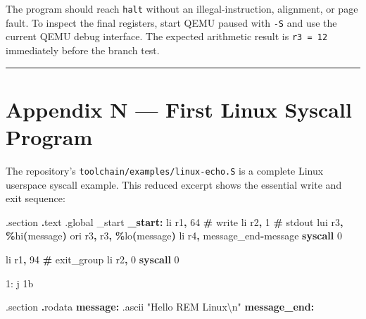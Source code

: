 \documentclass[
  oneside,
  openany]{book}
\newenvironment{Shaded}{\begin{snugshade}}{\end{snugshade}}
\newcommand{\BaseNTok}[1]{\textcolor[rgb]{0.00,0.00,0.81}{#1}}
\newcommand{\BuiltInTok}[1]{#1}
\newcommand{\ControlFlowTok}[1]{\textcolor[rgb]{0.13,0.29,0.53}{\textbf{#1}}}
\newcommand{\DecValTok}[1]{\textcolor[rgb]{0.00,0.00,0.81}{#1}}
\newcommand{\FunctionTok}[1]{\textcolor[rgb]{0.13,0.29,0.53}{\textbf{#1}}}
\newcommand{\NormalTok}[1]{#1}
\newcommand{\OperatorTok}[1]{\textcolor[rgb]{0.81,0.36,0.00}{\textbf{#1}}}
\newcommand{\StringTok}[1]{\textcolor[rgb]{0.31,0.60,0.02}{#1}}
\begin{document}
The program should reach \texttt{halt} without an illegal-instruction,
alignment, or page fault. To inspect the final registers, start QEMU
paused with \texttt{-S} and use the current QEMU debug interface. The
expected arithmetic result is \texttt{r3\ =\ 12} immediately before the
branch test.

\begin{center}\rule{0.5\linewidth}{0.5pt}\end{center}

\hypertarget{appendix-n-first-linux-syscall-program}{%
\chapter{Appendix N --- First Linux Syscall
Program}\label{appendix-n-first-linux-syscall-program}}

The repository's \texttt{toolchain/examples/linux-echo.S} is a complete
Linux userspace syscall example. This reduced excerpt shows the
essential write and exit sequence:

\begin{Shaded}
\begin{Highlighting}[]
\NormalTok{.}\BuiltInTok{section} \OperatorTok{.}\NormalTok{text}
\NormalTok{.global \_start}
\FunctionTok{\_start:}
\NormalTok{        li   r1}\OperatorTok{,} \DecValTok{64}              \OperatorTok{\#}\NormalTok{ write}
\NormalTok{        li   r2}\OperatorTok{,} \DecValTok{1}               \OperatorTok{\#}\NormalTok{ stdout}
\NormalTok{        lui  r3}\OperatorTok{,} \OperatorTok{\%}\NormalTok{hi}\OperatorTok{(}\NormalTok{message}\OperatorTok{)}
\NormalTok{        ori  r3}\OperatorTok{,}\NormalTok{ r3}\OperatorTok{,} \OperatorTok{\%}\NormalTok{lo}\OperatorTok{(}\NormalTok{message}\OperatorTok{)}
\NormalTok{        li   r4}\OperatorTok{,}\NormalTok{ message\_end}\OperatorTok{{-}}\NormalTok{message}
        \ControlFlowTok{syscall} \DecValTok{0}

\NormalTok{        li   r1}\OperatorTok{,} \DecValTok{94}              \OperatorTok{\#}\NormalTok{ exit\_group}
\NormalTok{        li   r2}\OperatorTok{,} \DecValTok{0}
        \ControlFlowTok{syscall} \DecValTok{0}

\NormalTok{1:      j }\BaseNTok{1b}

\NormalTok{.}\BuiltInTok{section} \OperatorTok{.}\NormalTok{rodata}
\FunctionTok{message:}
\NormalTok{        .ascii }\StringTok{"Hello REM Linux\textbackslash{}n"}
\FunctionTok{message\_end:}
\end{Highlighting}
\end{Shaded}
\end{document}

